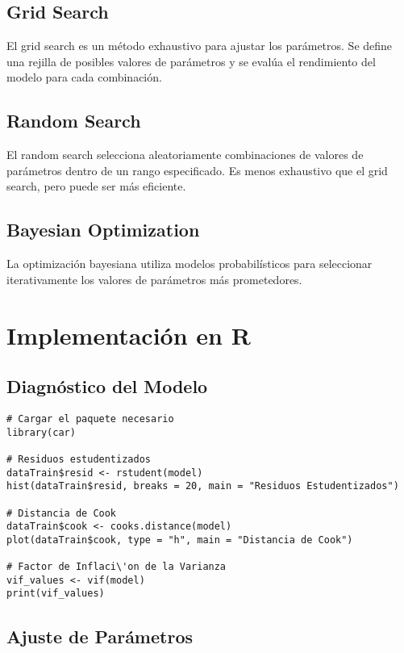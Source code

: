 \documentclass[a4paper]{report} %
\begin{document}
\subsection{Grid Search}

El grid search es un m\'etodo exhaustivo para ajustar los par\'ametros. Se define una rejilla de posibles valores de par\'ametros y se eval\'ua el rendimiento del modelo para cada combinaci\'on.

\subsection{Random Search}

El random search selecciona aleatoriamente combinaciones de valores de par\'ametros dentro de un rango especificado. Es menos exhaustivo que el grid search, pero puede ser m\'as eficiente.

\subsection{Bayesian Optimization}

La optimizaci\'on bayesiana utiliza modelos probabil\'isticos para seleccionar iterativamente los valores de par\'ametros m\'as prometedores.

\section{Implementaci\'on en R}

\subsection{Diagn\'ostico del Modelo}

\begin{verbatim}
# Cargar el paquete necesario
library(car)

# Residuos estudentizados
dataTrain$resid <- rstudent(model)
hist(dataTrain$resid, breaks = 20, main = "Residuos Estudentizados")

# Distancia de Cook
dataTrain$cook <- cooks.distance(model)
plot(dataTrain$cook, type = "h", main = "Distancia de Cook")

# Factor de Inflaci\'on de la Varianza
vif_values <- vif(model)
print(vif_values)
\end{verbatim}

\subsection{Ajuste de Par\'ametros}
\end{document}
